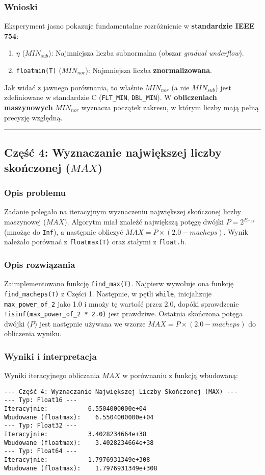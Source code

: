 \documentclass[11pt, a4paper]{article}
\newcommand{\taskseparator}{\leavevmode\leaders\hrule height 0.5pt\hfill\kern0pt}
\begin{document}
\subsubsection{Wnioski}
Eksperyment jasno pokazuje fundamentalne rozróżnienie w \textbf{standardzie IEEE 754}:
\begin{enumerate}
    \item $\eta$ ($MIN_{sub}$): Najmniejsza liczba subnormalna (obszar \textit{gradual underflow}).
    \item \texttt{floatmin(T)} ($MIN_{nor}$): Najmniejsza liczba \textbf{znormalizowana}.
\end{enumerate}
Jak widać z jawnego porównania, to właśnie $MIN_{nor}$ (a nie $MIN_{sub}$) jest zdefiniowane w standardzie C (\texttt{FLT\_MIN}, \texttt{DBL\_MIN}). W \textbf{obliczeniach maszynowych} $MIN_{nor}$ wyznacza początek zakresu, w którym liczby mają pełną precyzję względną.

\taskseparator

\subsection{Część 4: Wyznaczanie największej liczby skończonej ($MAX$)}

\subsubsection{Opis problemu}
Zadanie polegało na iteracyjnym wyznaczeniu największej skończonej liczby maszynowej ($MAX$). Algorytm miał znaleźć największą potęgę dwójki $P = 2^{E_{max}}$ (mnożąc do \texttt{Inf}), a następnie obliczyć $MAX = P \times (2.0 - macheps)$. Wynik należało porównać z \texttt{floatmax(T)} oraz stałymi z \texttt{float.h}.

\subsubsection{Opis rozwiązania}
Zaimplementowano funkcję \texttt{find\_max(T)}. Najpierw wywołuje ona funkcję \texttt{find\_macheps(T)} z Części 1. Następnie, w pętli \texttt{while}, inicjalizuje \texttt{max\_power\_of\_2} jako 1.0 i mnoży tę wartość przez 2.0, dopóki sprawdzenie \texttt{!isinf(max\_power\_of\_2 * 2.0)} jest prawdziwe. Ostatnia skończona potęga dwójki ($P$) jest następnie używana we wzorze $MAX = P \times (2.0 - macheps)$ do obliczenia wyniku.

\subsubsection{Wyniki i interpretacja}
Wyniki iteracyjnego obliczania $MAX$ w porównaniu z funkcją wbudowaną:
\begin{verbatim}
--- Część 4: Wyznaczanie Największej Liczby Skończonej (MAX) ---
--- Typ: Float16 ---
Iteracyjnie:           6.5504000000e+04
Wbudowane (floatmax):    6.5504000000e+04
--- Typ: Float32 ---
Iteracyjnie:           3.4028234664e+38
Wbudowane (floatmax):    3.4028234664e+38
--- Typ: Float64 ---
Iteracyjnie:           1.7976931349e+308
Wbudowane (floatmax):    1.7976931349e+308
\end{verbatim}
\end{document}
